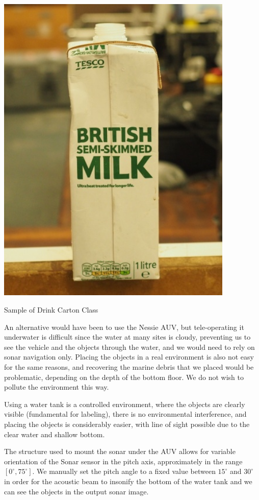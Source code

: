 \begin{marginfigure}
    \centering
    \includegraphics[width = 0.85\textwidth]{chapters/images/dataset/drink-carton.jpg}
    \caption{Sample of Drink Carton Class}
    \label{md:drink-carton}
\end{marginfigure}

An alternative would have been to use the Nessie AUV, but tele-operating it underwater is difficult since the water at many sites is cloudy, preventing us to see the vehicle and the objects through the water, and we would need to rely on sonar navigation only. Placing the objects in a real environment is also not easy for the same reasons, and recovering the marine debris that we placed would be problematic, depending on the depth of the bottom floor. We do not wish to pollute the environment this way.

Using a water tank is a controlled environment, where the objects are clearly visible (fundamental for labeling), there is no environmental interference, and placing the objects is considerably easier, with line of sight possible due to the clear water and shallow bottom.

The structure used to mount the sonar under the AUV allows for variable orientation of the Sonar sensor in the pitch axis, approximately in the range $[0^\circ, 75^\circ]$. We manually set the pitch angle to a fixed value between $15^\circ$ and $30^\circ$ in order for the acoustic beam to insonify the bottom of the water tank and we can see the objects in the output sonar image.

